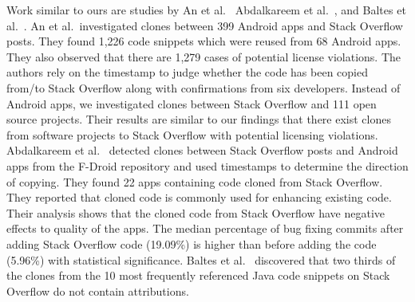 \documentclass[10pt,journal,compsoc]{IEEEtran}
\begin{document}
Work similar to ours are studies by An et al.~\cite{An2017}
Abdalkareem et al.~\cite{Abdalkareem2017}, and Baltes et al.~\cite{Baltes2017}. 
An et al.~investigated clones
between 399 Android apps and Stack Overflow posts. They found 1,226 code
snippets which were reused from 68 Android apps. They also observed that there
are 1,279 cases of potential license violations. The authors rely on the
timestamp to judge whether the code has been copied from/to Stack Overflow along
with confirmations from six developers. Instead of Android apps, we investigated
clones between Stack Overflow and 111 open source projects. Their results are
similar to our findings that there exist clones from software projects to Stack
Overflow with potential licensing violations. Abdalkareem et
al.~\cite{Abdalkareem2017} detected clones between Stack Overflow posts and
Android apps from the F-Droid repository and used timestamps to
determine the direction
of copying. They found 22 apps containing code cloned from Stack Overflow. They
reported that cloned code is commonly used for enhancing existing code. Their
analysis shows that the cloned code from Stack Overflow have negative effects to
quality of the apps. The median percentage of bug fixing commits after adding
Stack Overflow code (19.09\%) is higher than before adding the code (5.96\%)
with statistical significance.
Baltes et al.~\cite{Baltes2017} discovered that two
thirds of the clones from the 10 most frequently referenced Java code snippets on Stack
Overflow do not contain attributions.
\end{document}
